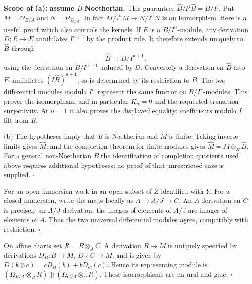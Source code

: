 \documentclass[11pt]{article}
\let\chapterexercise\exercise
\renewcommand{\exercise}[2]{\Needspace{8\baselineskip}\chapterexercise{#1}{#2}}
\begin{document}
\pf
\textbf{Scope of (a): assume $B$ Noetherian.} This guarantees $\widehat B/I^j\widehat B=B/I^j$. Put $M=\Omega_{B/A}$ and $N=\Omega_{\widehat B/A}$. In fact $M/I^nM\to N/I^nN$ is an isomorphism. Here is a useful proof which also controls the kernels. If $E$ is a $B/I^n$-module, any derivation $D:B\to E$ annihilates $I^{n+1}$ by the product rule. It therefore extends uniquely to $\widehat B$ through
\[ \widehat B\longrightarrow B/I^{n+1}, \]
using the derivation on $B/I^{n+1}$ induced by $D$. Conversely a derivation on $\widehat B$ into $E$ annihilates $(I\widehat B)^{n+1}$, so is determined by its restriction to $B$. The two differential modules modulo $I^n$ represent the same functor on $B/I^n$-modules. This proves the isomorphism, and in particular $K_n=0$ and the requested transition surjectivity. At $n=1$ it also proves the displayed equality: coefficients modulo $I$ lift from $B$.

(b) The hypotheses imply that $B$ is Noetherian and $M$ is finite. Taking inverse limits gives $\widehat M$, and the completion theorem for finite modules gives $\widehat M=M\otimes_B\widehat B$. For a general non-Noetherian $B$ the identification of completion quotients used above requires additional hypotheses; no proof of that unrestricted case is supplied. \hfill$\square$

\pf
For an open immersion work in an open subset of $Z$ identified with $Y$. For a closed immersion, write the maps locally as $A\to A/J\to C$. An $A$-derivation on $C$ is precisely an $A/J$-derivation: the images of elements of $A/J$ are images of elements of $A$. Thus the two universal differential modules agree, compatibly with restriction. \hfill$\square$

\pf
On affine charts set $R=B\otimes_A C$. A derivation $R\to M$ is uniquely specified by derivations $D_B:B\to M$, $D_C:C\to M$, and is given by $D(b\otimes c)=cD_B(b)+bD_C(c)$. Hence its representing module is $(\Omega_{B/A}\otimes_B R)\oplus(\Omega_{C/A}\otimes_C R)$. These isomorphisms are natural and glue. \hfill$\square$
\end{document}
